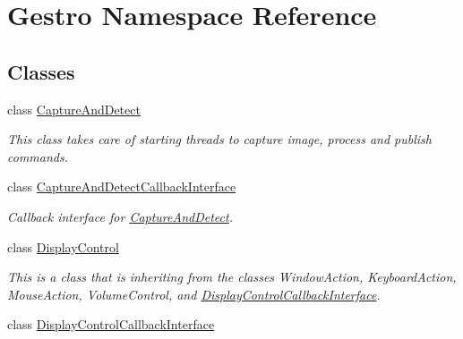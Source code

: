 \hypertarget{namespaceGestro}{}\section{Gestro Namespace Reference}
\label{namespaceGestro}
\subsection*{Classes}
\begin{DoxyCompactItemize}
\item 
class \hyperlink{classGestro_1_1CaptureAndDetect}{Capture\+And\+Detect}
\begin{DoxyCompactList}\small\item\em This class takes care of starting threads to capture image, process and publish commands. \end{DoxyCompactList}\item 
class \hyperlink{classGestro_1_1CaptureAndDetectCallbackInterface}{Capture\+And\+Detect\+Callback\+Interface}
\begin{DoxyCompactList}\small\item\em Callback interface for \hyperlink{classGestro_1_1CaptureAndDetect}{Capture\+And\+Detect}. \end{DoxyCompactList}\item 
class \hyperlink{classGestro_1_1DisplayControl}{Display\+Control}
\begin{DoxyCompactList}\small\item\em This is a class that is inheriting from the classes Window\+Action, Keyboard\+Action, Mouse\+Action, Volume\+Control, and \hyperlink{classGestro_1_1DisplayControlCallbackInterface}{Display\+Control\+Callback\+Interface}. \end{DoxyCompactList}\item 
class \hyperlink{classGestro_1_1DisplayControlCallbackInterface}{Display\+Control\+Callback\+Interface}
\end{DoxyCompactItemize}
